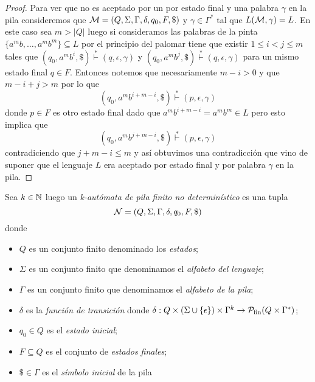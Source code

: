 \documentclass[tesis.tex]{subfiles}
\begin{document}
\begin{proof}
		
		
%		
%		
%		
		
		Para ver que no es aceptado por un \APD por estado final y una palabra $\gamma$ en la pila consideremos que ${\cal M} = (Q,\Sigma, \Gamma, \delta, q_0, F, \$)$ \APD y $\gamma \in \Gamma^{*}$ tal que $L({\cal M}, \gamma) = L$.
		En este caso sea $m > |Q|$ luego si consideramos las palabras de la pinta $\{ a^mb, \dots, a^mb^m  \} \subseteq L$ por el principio del palomar tiene que existir $1 \le i < j \le m$ tales que $(q_{0},a^mb^i, \$) \overset{*}{\vdash} (q,\epsilon,\gamma)$ y $(q_{0},a^mb^j, \$) \overset{*}{\vdash} (q,\epsilon,\gamma)$ para un mismo estado final $q \in F$.
		Entonces notemos que necesariamente $m - i > 0$ y que $m-i+j > m$ por lo que
		\[
			(q_{0},a^mb^{i+m-i}, \$) \overset{*}{\vdash} (p,\epsilon,\gamma)
		\]
		donde $p \in F$ es otro estado final dado que $a^mb^{i+m-i} = a^mb^m \in L$ pero esto implica que 
		\[
		(q_{0},a^mb^{j+m-i}, \$) \overset{*}{\vdash} (p,\epsilon,\gamma)
		\]
		contradiciendo que $j+m-i \le m$ y así obtuvimos una contradicción que vino de suponer que el lenguaje $L$ era aceptado por estado final y por palabra $\gamma$ en la pila.
	
\end{proof}


\begin{deff}
	Sea $k \in \mathbb{N}$ luego un \emph{k-autómata de pila finito no determinístico} es una tupla 
	\[
	{\cal N } = (Q, \Sigma, \Gamma, \delta, q_0, F, \$)
	\]
	donde 
	\begin{itemize}
		\item $Q$ es un conjunto finito denominado los \emph{estados};
		\item $\Sigma$ es un conjunto finito que denominamos el \emph{alfabeto del lenguaje};
		\item $\Gamma$ es un conjunto finito que denominamos el \emph{alfabeto de la pila};
		\item $\delta$ es la \emph{función de transición} donde $\delta: Q  \times (\Sigma \cup \{ \epsilon \}) \times \Gamma^{k} \to {\cal P}_{\textrm{fin}}( Q  \times \Gamma^*)$;
		\item $q_0 \in Q$ es el \emph{estado inicial};
		\item $F \subseteq Q$ es el conjunto de \emph{estados finales};
		\item $\$ \in \Gamma$ es el \emph{símbolo inicial} de la pila
	\end{itemize}
\end{deff}
\end{document}
